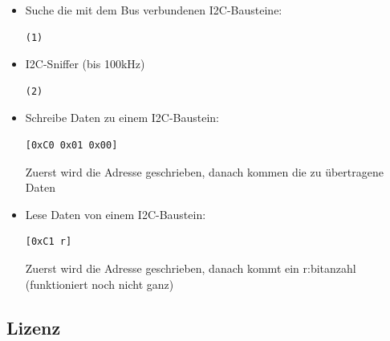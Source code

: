 \documentclass[a4paper,10pt]{article}
\begin{document}
\begin{itemize}
 \item Suche die mit dem Bus verbundenen I2C-Bausteine:
    \begin{lstlisting}
(1)
    \end{lstlisting}
 \item I2C-Sniffer (bis 100kHz)
    \begin{lstlisting}
(2)
    \end{lstlisting}

  \item Schreibe Daten zu einem I2C-Baustein:
    \begin{lstlisting}
[0xC0 0x01 0x00]
    \end{lstlisting}
    Zuerst wird die Adresse geschrieben, danach kommen die zu übertragene Daten
    
\item Lese Daten von einem I2C-Baustein:
    \begin{lstlisting}
[0xC1 r]
    \end{lstlisting}
    Zuerst wird die Adresse geschrieben, danach kommt ein r:bitanzahl (funktioniert noch nicht ganz)
\end{itemize}


\newpage
\subsection{Lizenz}


\end{document}
